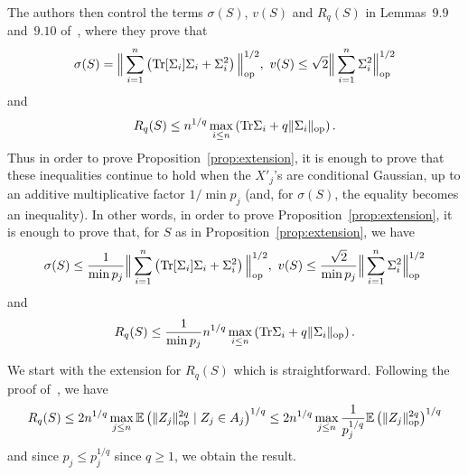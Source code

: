 \documentclass[]{article}
\newcommand{\E}{\mathbb{E}}
\newcommand{\Tr}{\text{\rm Tr}}
\newcommand{\op}{{\rm op}}
\theoremstyle{plain}
\theoremstyle{definition}
\begin{document}
The authors then control the terms $\sigma(S)$, $v(S)$ and $R_q(S)$ in Lemmas~$9.9$ and~$9.10$ of~\cite{Brailovskaya24-0}, where they prove that
\[ \sigma(S) = \Big \lVert\sum_{i=1}^n \left( \Tr[\Sigma_i] \Sigma_i + \Sigma_i^2 \right) \Big \rVert_\op^{1/2}, \ v(S) \leq \sqrt{2} \Big \lVert\sum_{i=1}^n \Sigma_i^2 \Big \rVert_\op^{1/2} \]
and
\[ R_q(S) \leq n^{1/q} \max_{i\leq n} \left( \Tr \Sigma_i + q \lVert \Sigma_i \rVert_\op \right). \]
Thus in order to prove Proposition~\ref{prop:extension}, it is enough to prove that these inequalities continue to hold when the $X'_j$'s are conditional Gaussian, up to an additive multiplicative factor $1/\min p_j$ (and, for $\sigma(S)$, the equality becomes an inequality). In other words, in order to prove Proposition~\ref{prop:extension}, it is enough to prove that, for $S$ as in Proposition~\ref{prop:extension}, we have
\[ \sigma(S) \leq \frac{1}{\min p_j} \Big \lVert\sum_{i=1}^n \left( \Tr[\Sigma_i] \Sigma_i + \Sigma_i^2 \right) \Big \rVert_\op^{1/2}, \ v(S) \leq \frac{\sqrt{2}}{\min p_j} \Big \lVert\sum_{i=1}^n \Sigma_i^2 \Big \rVert_\op^{1/2} \]
and
\[ R_q(S) \leq \frac{1}{\min p_j} n^{1/q} \max_{i\leq n} \left( \Tr \Sigma_i + q \lVert \Sigma_i \rVert_\op \right). \]

We start with the extension for $R_q(S)$ which is straightforward. Following the proof of~\cite[Lemma 9.10]{Brailovskaya24-0}, we have
\[ R_q(S) \leq 2 n^{1/q} \max_{j \leq n} \E \left( \lVert Z_j \rVert_\op^{2q} \mid Z_j \in A_j \right)^{1/q} \leq 2 n^{1/q} \max_{j \leq n} \frac{1}{p_j^{1/q}} \E \left( \lVert Z_j \rVert_\op^{2q} \right)^{1/q} \]
and since $p_j \leq p_j^{1/q}$ since $q \geq 1$, we obtain the result.
\end{document}
